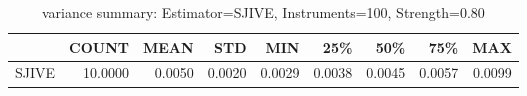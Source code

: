 \begin{table}[ht]
\centering
\caption{variance summary: Estimator=SJIVE, Instruments=100, Strength=0.80}
\begin{tabular}{lrrrrrrrr}
\toprule
 & COUNT & MEAN & STD & MIN & 25\% & 50\% & 75\% & MAX \\
\midrule
SJIVE & 10.0000 & 0.0050 & 0.0020 & 0.0029 & 0.0038 & 0.0045 & 0.0057 & 0.0099 \\
\bottomrule
\end{tabular}
\end{table}
